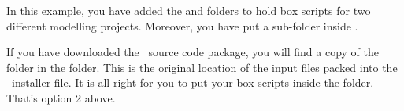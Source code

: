 In this example, you have added the  and  folders to hold box scripts for two different modelling projects. Moreover, you have put a  sub-folder inside .

If you have downloaded the \US\ source code package, you will find a copy of the  folder in the  folder. This is the original location of the input files packed into the \US\ installer file. It is all right for you to put your box scripts inside the  folder. That's option 2 above.

